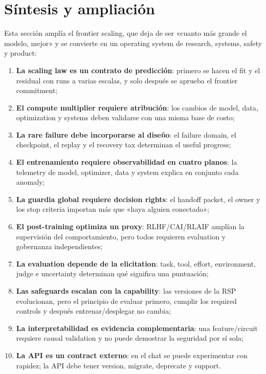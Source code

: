\section{Síntesis y ampliación}

Esta sección amplía el frontier scaling, que deja de ser «cuanto más grande el modelo, mejor» y se convierte en un operating system de research, systems, safety y product:

\begin{enumerate}
  \item \textbf{La scaling law es un contrato de predicción}: primero se hacen el fit y el residual con runs a varias escalas, y solo después se aprueba el frontier commitment;
  \item \textbf{El compute multiplier requiere atribución}: los cambios de model, data, optimization y systems deben validarse con una misma base de costo;
  \item \textbf{La rare failure debe incorporarse al diseño}: el failure domain, el checkpoint, el replay y el recovery tax determinan el useful progress;
  \item \textbf{El entrenamiento requiere observabilidad en cuatro planos}: la telemetry de model, optimizer, data y system explica en conjunto cada anomaly;
  \item \textbf{La guardia global requiere decision rights}: el handoff packet, el owner y los stop criteria importan más que «haya alguien conectado»;
  \item \textbf{El post-training optimiza un proxy}: RLHF/CAI/RLAIF amplían la supervisión del comportamiento, pero todos requieren evaluation y gobernanza independientes;
  \item \textbf{La evaluation depende de la elicitation}: task, tool, effort, environment, judge e uncertainty determinan qué significa una puntuación;
  \item \textbf{Las safeguards escalan con la capability}: las versiones de la RSP evolucionan, pero el principio de evaluar primero, cumplir los required controls y después entrenar/desplegar no cambia;
  \item \textbf{La interpretabilidad es evidencia complementaria}: una feature/circuit requiere causal validation y no puede demostrar la seguridad por sí sola;
  \item \textbf{La API es un contract externo}: en el chat se puede experimentar con rapidez; la API debe tener version, migrate, deprecate y support.
\end{enumerate}

